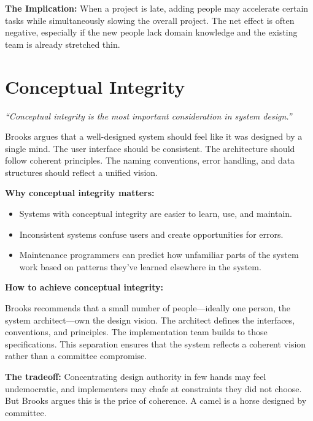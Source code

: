 \documentclass[11pt, letterpaper]{article}
\begin{document}
\textbf{The Implication:} When a project is late, adding people may accelerate certain tasks while simultaneously slowing the overall project. The net effect is often negative, especially if the new people lack domain knowledge and the existing team is already stretched thin.

\vspace{1em}

\section*{Conceptual Integrity}

\begin{center}
\textit{``Conceptual integrity is the most important consideration in system design.''}
\end{center}

\vspace{0.5em}

Brooks argues that a well-designed system should feel like it was designed by a single mind. The user interface should be consistent. The architecture should follow coherent principles. The naming conventions, error handling, and data structures should reflect a unified vision.

\textbf{Why conceptual integrity matters:}

\begin{itemize}
    \item Systems with conceptual integrity are easier to learn, use, and maintain.
    \item Inconsistent systems confuse users and create opportunities for errors.
    \item Maintenance programmers can predict how unfamiliar parts of the system work based on patterns they've learned elsewhere in the system.
\end{itemize}

\textbf{How to achieve conceptual integrity:}

Brooks recommends that a small number of people---ideally one person, the system architect---own the design vision. The architect defines the interfaces, conventions, and principles. The implementation team builds to those specifications. This separation ensures that the system reflects a coherent vision rather than a committee compromise.

\textbf{The tradeoff:} Concentrating design authority in few hands may feel undemocratic, and implementers may chafe at constraints they did not choose. But Brooks argues this is the price of coherence. A camel is a horse designed by committee.
\end{document}
